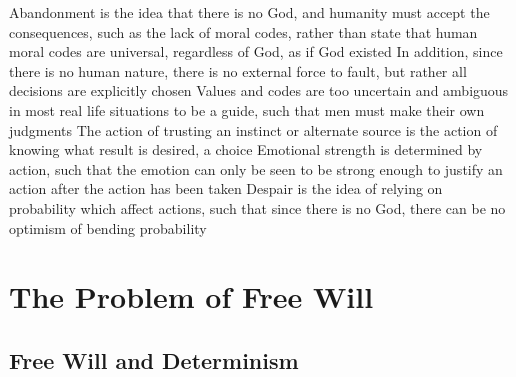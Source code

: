 \documentclass[11 pt, twoside]{article}
\newenvironment{outline*}
{
	\begin{outline}[enumerate]
	}
	{\end{outline}
}
\begin{document}
\begin{outline*}
\1 Abandonment is the idea that there is no God, and humanity must accept the consequences, such as the lack of moral codes, rather than state that human moral codes are universal, regardless of God, as if God existed
\2 In addition, since there is no human nature, there is no external force to fault, but rather all decisions are explicitly chosen
\2 Values and codes are too uncertain and ambiguous in most real life situations to be a guide, such that men must make their own judgments
\2 The action of trusting an instinct or alternate source is the action of knowing what result is desired, a choice
\2 Emotional strength is determined by action, such that the emotion can only be seen to be strong enough to justify an action after the action has been taken
\1 Despair is the idea of relying on probability which affect actions, such that since there is no God, there can be no optimism of bending probability
\2 
\end{outline*}

\section{The Problem of Free Will}
\subsection{Free Will and Determinism}
\begin{outline*}

\end{outline*}
\end{document}
